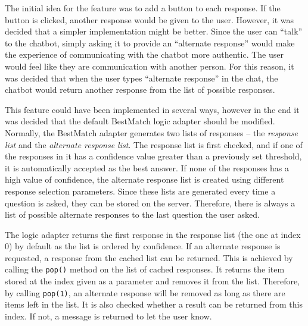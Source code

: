 \documentclass[12pt,a4paper]{article}
\begin{document}
The initial idea for the feature was to add a button to each response. If the button is clicked, another response would be given to the user. However, it was decided that a simpler implementation might be better. Since the user can “talk” to the chatbot, simply asking it to provide an “alternate response” would make the experience of communicating with the chatbot more authentic. The user would feel like they are communication with another person. For this reason, it was decided that when the user types “alternate response” in the chat, the chatbot would return another response from the list of possible responses.

This feature could have been implemented in several ways, however in the end it was decided that the default BestMatch logic adapter should be modified. Normally, the BestMatch adapter generates two lists of responses – the \textit{response list} and the \textit{alternate response list}. The response list is first checked, and if one of the responses in it has a confidence value greater than a previously set threshold, it is automatically accepted as the best answer. If none of the responses has a high value of confidence, the alternate response list is created using different response selection parameters. Since these lists are generated every time a question is asked, they can be stored on the server. Therefore, there is always a list of possible alternate responses to the last question the user asked. 

The logic adapter returns the first response in the response list (the one at index 0) by default as the list is ordered by confidence. If an alternate response is requested, a response from the cached list can be returned. This is achieved by calling the \texttt{pop()} method on the list of cached responses. It returns the item stored at the index given as a parameter and removes it from the list. Therefore, by calling \texttt{pop(1)}, an alternate response will be removed as long as there are items left in the list. It is also checked whether a result can be returned from this index. If not, a message is returned to let the user know.
\end{document}
